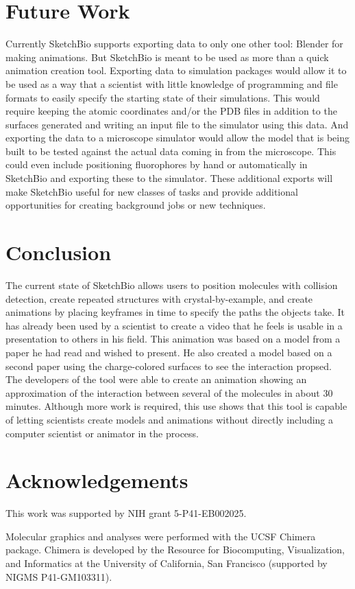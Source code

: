 \documentclass{article} %
\begin{document}
\section{Future Work}
Currently SketchBio supports exporting data to only one other tool: Blender for making animations.  But SketchBio is meant to be used as more than a quick animation creation tool.  Exporting data to simulation packages would allow it to be used as a way that a scientist with little knowledge of programming and file formats to easily specify the starting state of their simulations.  This would require keeping the atomic coordinates and/or the PDB files in addition to the surfaces generated and writing an input file to the simulator using this data.  And exporting the data to a microscope simulator would allow the model that is being built to be tested against the actual data coming in from the microscope.  This could even include positioning fluorophores by hand or automatically in SketchBio and exporting these to the simulator.  These additional exports will make SketchBio useful for new classes of tasks and provide additional opportunities for creating background jobs or new techniques.

\section{Conclusion}
The current state of SketchBio allows users to position molecules with collision detection, create repeated structures with crystal-by-example, and create animations by placing keyframes in time to specify the paths the objects take.  It has already been used by a scientist to create a video that he feels is usable in a presentation to others in his field.  This animation was based on a model from a paper he had read and wished to present.  He also created a model based on a second paper using the charge-colored surfaces to see the interaction propsed.  The developers of the tool were able to create an animation showing an approximation of the interaction between several of the molecules in about 30 minutes.  Although more work is required, this use shows that this tool is capable of letting scientists create models and animations without directly including a computer scientist or animator in the process.

\section{Acknowledgements}
This work was supported by NIH grant 5-P41-EB002025.

Molecular graphics and analyses were performed with the UCSF Chimera package. Chimera is developed by the Resource for Biocomputing, Visualization, and Informatics at the University of California, San Francisco (supported by NIGMS P41-GM103311).



\end{document}
